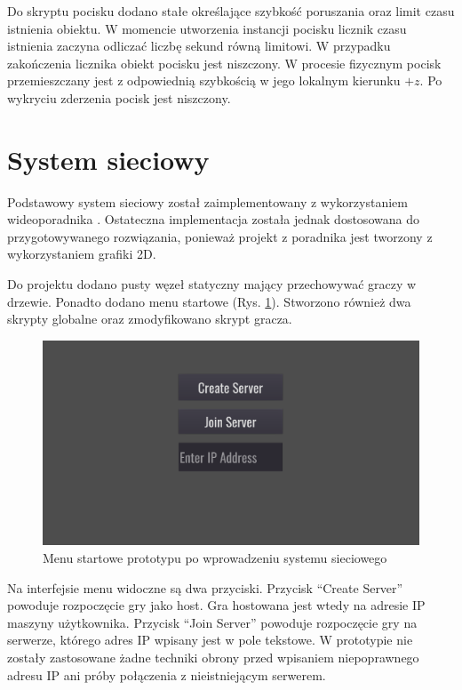Do skryptu pocisku dodano stałe określające szybkość poruszania oraz limit czasu istnienia obiektu. W momencie utworzenia instancji pocisku licznik czasu istnienia zaczyna odliczać liczbę sekund równą limitowi. W przypadku zakończenia licznika obiekt pocisku jest niszczony. W procesie fizycznym pocisk przemieszczany jest z odpowiednią szybkością w jego lokalnym kierunku $+z$. Po wykryciu zderzenia pocisk jest niszczony.   

\section{System sieciowy}\label{sec:network_prototype}

Podstawowy system sieciowy został zaimplementowany z wykorzystaniem wideoporadnika \cite{godot_network_tutorial}. Ostateczna implementacja została jednak dostosowana do przygotowywanego rozwiązania, ponieważ projekt z poradnika jest tworzony z wykorzystaniem grafiki 2D.

Do projektu dodano pusty węzeł statyczny mający przechowywać graczy w drzewie. Ponadto dodano menu startowe (Rys. \ref{fig:prototype_menu}). Stworzono również dwa skrypty globalne oraz zmodyfikowano skrypt gracza.

\begin{figure}
    \centering
    \includegraphics[width=.9\linewidth]{Images/prototype/prototype_net_menu.png}
    \caption{Menu startowe prototypu po wprowadzeniu systemu sieciowego}
    \label{fig:prototype_menu}
\end{figure}

Na interfejsie menu widoczne są dwa przyciski. Przycisk ``Create Server'' powoduje rozpoczęcie gry jako host. Gra hostowana jest wtedy na adresie IP maszyny użytkownika. Przycisk ``Join Server'' powoduje rozpoczęcie gry na serwerze, którego adres IP wpisany jest w pole tekstowe. W prototypie nie zostały zastosowane żadne techniki obrony przed wpisaniem niepoprawnego adresu IP ani próby połączenia z nieistniejącym serwerem.

